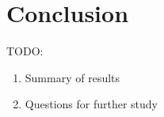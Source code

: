 \chapter{Conclusion}

TODO:

\begin{enumerate}
	\item Summary of results
	\item Questions for further study
\end{enumerate}